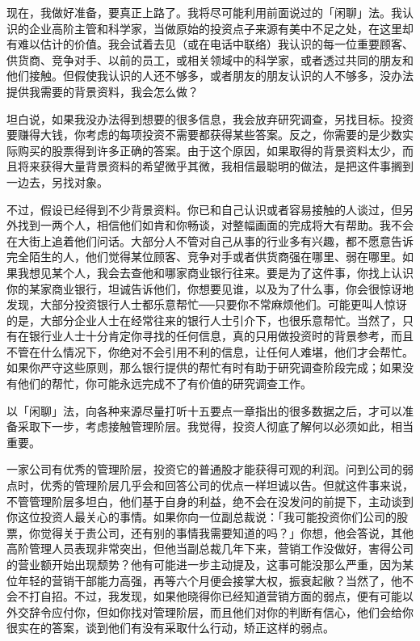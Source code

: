 \documentclass[UTF8,a4paper,zihao=-4,fontset = windows]{ctexart} %
\begin{document}
现在，我做好准备，要真正上路了。我将尽可能利用前面说过的「闲聊」法。我认识的企业高阶主管和科学家，当做原始的投资点子来源有美中不足之处，在这里却有难以估计的价值。我会试着去见（或在电话中联络）我认识的每一位重要顾客、供货商、竞争对手、以前的员工，或相关领域中的科学家，或者透过共同的朋友和他们接触。但假使我认识的人还不够多，或者朋友的朋友认识的人不够多，没办法提供我需要的背景资料，我会怎么做？

坦白说，如果我没办法得到想要的很多信息，我会放弃研究调查，另找目标。投资要赚得大钱，你考虑的每项投资不需要都获得某些答案。反之，你需要的是少数实际购买的股票得到许多正确的答案。由于这个原因，如果取得的背景资料太少，而且将来获得大量背景资料的希望微乎其微，我相信最聪明的做法，是把这件事搁到一边去，另找对象。

不过，假设已经得到不少背景资料。你已和自己认识或者容易接触的人谈过，但另外找到一两个人，相信他们如肯和你畅谈，对整幅画面的完成将大有帮助。我不会在大街上追着他们问话。大部分人不管对自己从事的行业多有兴趣，都不愿意告诉完全陌生的人，他们觉得某位顾客、竞争对手或者供货商强在哪里、弱在哪里。如果我想见某个人，我会去查他和哪家商业银行往来。要是为了这件事，你找上认识你的某家商业银行，坦诚告诉他们，你想要见谁，以及为了什么事，你会很惊讶地发现，大部分投资银行人士都乐意帮忙──只要你不常麻烦他们。可能更叫人惊讶的是，大部分企业人士在经常往来的银行人士引介下，也很乐意帮忙。当然了，只有在银行业人士十分肯定你寻找的任何信息，真的只用做投资时的背景参考，而且不管在什么情况下，你绝对不会引用不利的信息，让任何人难堪，他们才会帮忙。如果你严守这些原则，那么银行提供的帮忙有时有助于研究调查阶段完成；如果没有他们的帮忙，你可能永远完成不了有价值的研究调查工作。

以「闲聊」法，向各种来源尽量打听十五要点一章指出的很多数据之后，才可以准备采取下一步，考虑接触管理阶层。我觉得，投资人彻底了解何以必须如此，相当重要。

一家公司有优秀的管理阶层，投资它的普通股才能获得可观的利润。问到公司的弱点时，优秀的管理阶层几乎会和回答公司的优点一样坦诚以告。但就这件事来说，不管管理阶层多坦白，他们基于自身的利益，绝不会在没发问的前提下，主动谈到你这位投资人最关心的事情。如果你向一位副总裁说：「我可能投资你们公司的股票，你觉得关于贵公司，还有别的事情我需要知道的吗？」你想，他会答说，其他高阶管理人员表现非常突出，但他当副总裁几年下来，营销工作没做好，害得公司的营业额开始出现颓势？他有可能进一步主动提及，这事可能没那么严重，因为某位年轻的营销干部能力高强，再等六个月便会接掌大权，振衰起敝？当然了，他不会不打自招。不过，我发现，如果他晓得你已经知道营销方面的弱点，便有可能以外交辞令应付你，但如你找对管理阶层，而且他们对你的判断有信心，他们会给你很实在的答案，谈到他们有没有采取什么行动，矫正这样的弱点。
\end{document}
